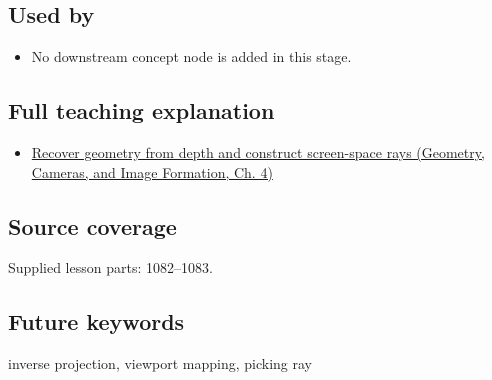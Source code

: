 \subsection{Used by}\label{appendix-f1a6d43e80d1-used-by}

\hypertarget{appendix-f1a6d43e80d1-used-by}{}

\begin{itemize}
\tightlist
\item
  No downstream concept node is added in this stage.
\end{itemize}

\subsection{Full teaching explanation}\label{appendix-f1a6d43e80d1-full-teaching-explanation}

\hypertarget{appendix-f1a6d43e80d1-full-teaching-explanation}{}

\begin{itemize}
\tightlist
\item
  \href{../03-Geometry-Cameras-and-Image-Formation/main.pdf\#nameddest=02-foundations-ii-ch035-recover-geometry-from-depth-and-construct-screen-space-rays}{Recover geometry from depth and construct screen-space rays (Geometry, Cameras, and Image Formation, Ch. 4)}
\end{itemize}

\subsection{Source coverage}\label{appendix-f1a6d43e80d1-source-coverage}

\hypertarget{appendix-f1a6d43e80d1-source-coverage}{}

Supplied lesson parts: 1082--1083.

\subsection{Future keywords}\label{appendix-f1a6d43e80d1-future-keywords}

\hypertarget{appendix-f1a6d43e80d1-future-keywords}{}

inverse projection, viewport mapping, picking ray
